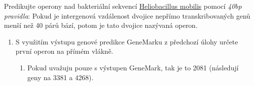 \documentclass[11pt]{article}
\begin{document}
Predikujte operony nad bakteriální sekvencí \href{./heliobacillus\_mobilis.txt}{Heliobacillus mobilis} pomocí \emph{40bp
pravidla}: Pokud je intergenová vzdálenost dvojice nepřímo transkribovaných genů
menší než 40 párů bází, potom je tato dvojice nazývaná operon.

\begin{enumerate}
\item S využitím výstupu genové predikce GeneMarku z předchozí úlohy určete první
operon na přímém vlákně.
\begin{enumerate}
\item Pokud uvažuju pouze s výstupen GeneMark, tak je to 2081 (následují geny na
3381 a 4268).
\end{enumerate}
\end{enumerate}
\end{document}
